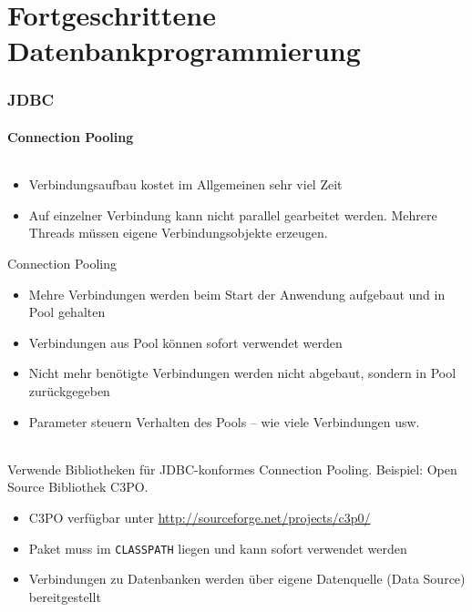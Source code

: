 \part{Fortgeschrittene Datenbankprogrammierung}
\label{part:programmierungAdvanced}

\section{JDBC}
\subsection{Connection Pooling}

\begin{frame}[t]\frametitle{\insertsection}
\framesubtitle{\insertsubsection}
\begin{itemize}
	\item Verbindungsaufbau kostet im Allgemeinen sehr viel Zeit 
	\item Auf einzelner Verbindung kann nicht parallel gearbeitet werden. Mehrere Threads müssen 
	eigene Verbindungsobjekte erzeugen.
\end{itemize}
\onslide\pause 
\begin{block}{Connection Pooling}
	\begin{itemize}
		\item Mehre Verbindungen werden beim Start der Anwendung aufgebaut und in Pool gehalten
		\item Verbindungen aus Pool können sofort verwendet werden
		\item Nicht mehr benötigte Verbindungen werden nicht abgebaut, sondern in Pool zurückgegeben 
		\item Parameter steuern Verhalten des Pools -- wie viele Verbindungen usw.
	\end{itemize}
\end{block}
\end{frame}

\begin{frame}[fragile]\frametitle{\insertsection}
\framesubtitle{\insertsubsection}
\abs
Verwende Bibliotheken f\"ur JDBC-konformes Connection Pooling. 
\nl
Beispiel: Open Source Bibliothek C3PO.
\abs
\onslide\pause
\begin{itemize}
\item C3PO verf\"ugbar unter \url{http://sourceforge.net/projects/c3p0/}
\item Paket muss im \texttt{CLASSPATH} liegen und kann sofort verwendet werden
\item Verbindungen zu Datenbanken werden über eigene Datenquelle (Data Source) bereitgestellt
\end{itemize} 
\end{frame}

